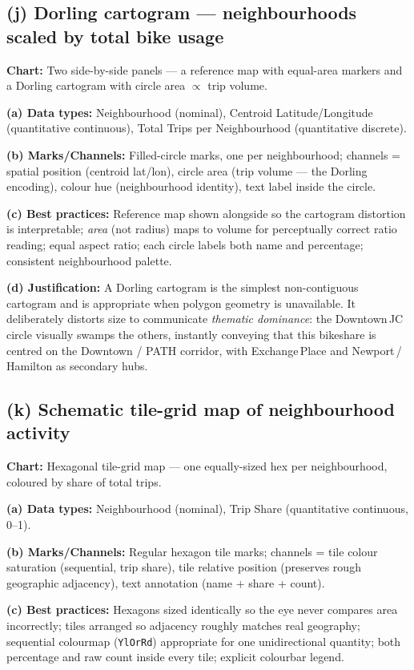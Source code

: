 \documentclass[11pt, a4paper]{article}
\begin{document}
\subsection{(j) Dorling cartogram --- neighbourhoods scaled by total bike usage}
\textbf{Chart:} Two side-by-side panels --- a reference map with equal-area markers and a Dorling cartogram with circle area $\propto$ trip volume.

\textbf{(a) Data types:} Neighbourhood (nominal), Centroid Latitude/Longitude (quantitative continuous), Total Trips per Neighbourhood (quantitative discrete).

\textbf{(b) Marks/Channels:} Filled-circle marks, one per neighbourhood; channels = spatial position (centroid lat/lon), circle area (trip volume --- the Dorling encoding), colour hue (neighbourhood identity), text label inside the circle.

\textbf{(c) Best practices:} Reference map shown alongside so the cartogram distortion is interpretable; \emph{area} (not radius) maps to volume for perceptually correct ratio reading; equal aspect ratio; each circle labels both name and percentage; consistent neighbourhood palette.

\textbf{(d) Justification:} A Dorling cartogram is the simplest non-contiguous cartogram and is appropriate when polygon geometry is unavailable. It deliberately distorts size to communicate \emph{thematic dominance}: the Downtown\,JC circle visually swamps the others, instantly conveying that this bikeshare is centred on the Downtown / PATH corridor, with Exchange\,Place and Newport\,/\,Hamilton as secondary hubs.

\subsection{(k) Schematic tile-grid map of neighbourhood activity}
\textbf{Chart:} Hexagonal tile-grid map --- one equally-sized hex per neighbourhood, coloured by share of total trips.

\textbf{(a) Data types:} Neighbourhood (nominal), Trip Share (quantitative continuous, 0--1).

\textbf{(b) Marks/Channels:} Regular hexagon tile marks; channels = tile colour saturation (sequential, trip share), tile relative position (preserves rough geographic adjacency), text annotation (name + share + count).

\textbf{(c) Best practices:} Hexagons sized identically so the eye never compares area incorrectly; tiles arranged so adjacency roughly matches real geography; sequential colourmap (\texttt{YlOrRd}) appropriate for one unidirectional quantity; both percentage and raw count inside every tile; explicit colourbar legend.
\end{document}
